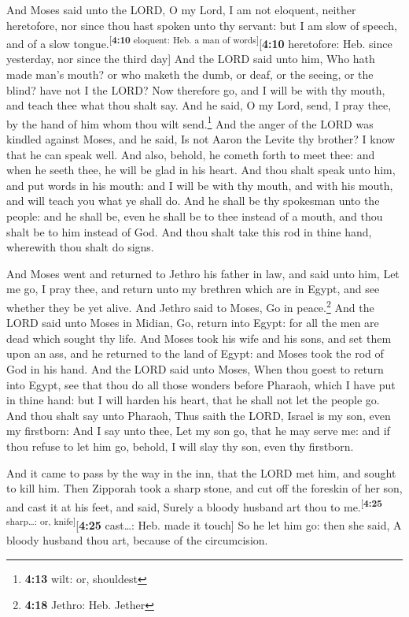  And Moses said unto the LORD, O my Lord, I am not
eloquent, neither heretofore, nor since thou hast spoken unto thy
servant: but I am slow of speech, and of a slow
tongue.\textsuperscript{{[}\textbf{4:10} eloquent: Heb. a man of
words{]}}{[}\textbf{4:10} heretofore: Heb. since yesterday, nor since
the third day{]}  And the LORD said unto him, Who hath
made man's mouth? or who maketh the dumb, or deaf, or the seeing, or the
blind? have not I the LORD?  Now therefore go, and I will
be with thy mouth, and teach thee what thou shalt say. 
And he said, O my Lord, send, I pray thee, by the hand of him whom thou
wilt send.\footnote{\textbf{4:13} wilt: or, shouldest} 
And the anger of the LORD was kindled against Moses, and he said, Is not
Aaron the Levite thy brother? I know that he can speak well. And also,
behold, he cometh forth to meet thee: and when he seeth thee, he will be
glad in his heart.  And thou shalt speak unto him, and
put words in his mouth: and I will be with thy mouth, and with his
mouth, and will teach you what ye shall do.  And he shall
be thy spokesman unto the people: and he shall be, even he shall be to
thee instead of a mouth, and thou shalt be to him instead of God.
 And thou shalt take this rod in thine hand, wherewith
thou shalt do signs.

 And Moses went and returned to Jethro his father in law,
and said unto him, Let me go, I pray thee, and return unto my brethren
which are in Egypt, and see whether they be yet alive. And Jethro said
to Moses, Go in peace.\footnote{\textbf{4:18} Jethro: Heb. Jether}
 And the LORD said unto Moses in Midian, Go, return into
Egypt: for all the men are dead which sought thy life. 
And Moses took his wife and his sons, and set them upon an ass, and he
returned to the land of Egypt: and Moses took the rod of God in his
hand.  And the LORD said unto Moses, When thou goest to
return into Egypt, see that thou do all those wonders before Pharaoh,
which I have put in thine hand: but I will harden his heart, that he
shall not let the people go.  And thou shalt say unto
Pharaoh, Thus saith the LORD, Israel is my son, even my firstborn:
 And I say unto thee, Let my son go, that he may serve
me: and if thou refuse to let him go, behold, I will slay thy son, even
thy firstborn.

 And it came to pass by the way in the inn, that the LORD
met him, and sought to kill him.  Then Zipporah took a
sharp stone, and cut off the foreskin of her son, and cast it at his
feet, and said, Surely a bloody husband art thou to
me.\textsuperscript{{[}\textbf{4:25} sharp\ldots: or,
knife{]}}{[}\textbf{4:25} cast\ldots: Heb. made it touch{]}
 So he let him go: then she said, A bloody husband thou
art, because of the circumcision.

